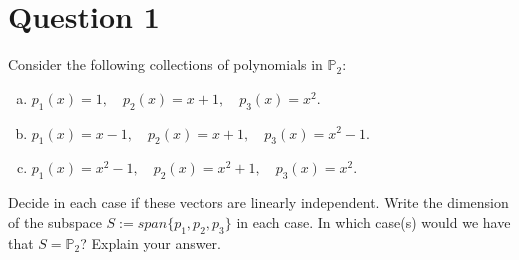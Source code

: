\documentclass{article}
\begin{document}
\section*{Question 1}
Consider the following collections of polynomials in $\mathbb{P}_2$:
\begin{enumerate}[(a)]
    \item $p_1(x) = 1, \quad p_2(x) = x + 1, \quad p_3(x) = x^2$.
    \item $p_1(x) = x - 1, \quad p_2(x) = x + 1, \quad p_3(x) = x^2 - 1$.
    \item $p_1(x) = x^2 - 1, \quad p_2(x) = x^2 + 1, \quad p_3(x) = x^2$.
\end{enumerate}
Decide in each case if these vectors are linearly independent.
Write the dimension of the subspace $S := span\{p_1, p_2, p_3\}$ in each case.
In which case(s) would we have that $S = \mathbb{P}_2$? Explain your answer.
\end{document}
